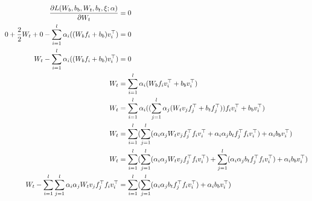 \begin{equation}
  \begin{aligned}
    \pdv{L(W_b,b_b,W_t,b_t,\xi;\alpha)}{W_t}                                        & = 0                                                                                                                                                                                    \\
    0 + \frac{2}{2}W_t + 0 - \sum_{i=1}^{l}\alpha_i((W_b f_i + b_b)v_i^\top)        & = 0                                                                                                                                                                                    \\
    W_t - \sum_{i=1}^{l}\alpha_i((W_b f_i + b_b)v_i^\top)                           & = 0                                                                                                                                                                                    \\
    W_t                                                                             & = \sum_{i=1}^{l}\alpha_i(W_b f_i v_i^\top + b_b v_i^\top)                                                                                                                              \\
    W_t                                                                             & = \sum_{i=1}^{l}\alpha_i((\sum_{j=1}^{l}\alpha_j(W_t v_j f_j^\top + b_t f_j^\top)) f_i v_i^\top+b_b v_i^\top)                                                                          \\
    W_t                                                                             & = \sum_{i=1}^{l}(\sum_{j=1}^{l}(\alpha_i\alpha_jW_t v_j f_j^\top f_i v_i^\top + \alpha_i\alpha_j b_t f_j^\top f_i v_i^\top) + \alpha_i b_b v_i^\top)                                   \\
    W_t                                                                             & = \sum_{i=1}^{l}(\sum_{j=1}^{l}(\alpha_i\alpha_jW_t v_j f_j^\top f_i v_i^\top) + \sum_{j=1}^{l}(\alpha_i\alpha_j b_t f_j^\top f_i v_i^\top) + \alpha_i b_b v_i^\top)                   \\
    W_t - \sum_{i=1}^{l}\sum_{j=1}^{l}\alpha_i\alpha_jW_t v_j f_j^\top f_i v_i^\top & = \sum_{i=1}^{l}(\sum_{j=1}^{l}(\alpha_i\alpha_j b_t f_j^\top f_i v_i^\top) + \alpha_i b_b v_i^\top)                                                                                   \\

\end{aligned}
\end{equation}
